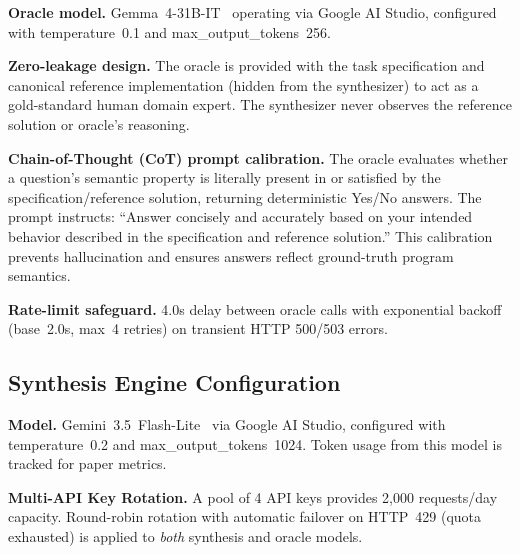 \documentclass[10pt,conference]{IEEEtran}
\begin{document}
\textbf{Oracle model.} Gemma~4-31B-IT~\cite{gemma4} operating via Google AI Studio, configured with temperature~0.1 and max\_output\_tokens~256.

\textbf{Zero-leakage design.} The oracle is provided with the task specification and canonical reference implementation (hidden from the synthesizer) to act as a gold-standard human domain expert. The synthesizer never observes the reference solution or oracle's reasoning.

\textbf{Chain-of-Thought (CoT) prompt calibration.} The oracle evaluates whether a question's semantic property is literally present in or satisfied by the specification/reference solution, returning deterministic Yes/No answers. The prompt instructs: ``Answer concisely and accurately based on your intended behavior described in the specification and reference solution.'' This calibration prevents hallucination and ensures answers reflect ground-truth program semantics.

\textbf{Rate-limit safeguard.} 4.0s delay between oracle calls with exponential backoff (base~2.0s, max~4 retries) on transient HTTP 500/503 errors.

\subsection{Synthesis Engine Configuration}
\textbf{Model.} Gemini~3.5~Flash-Lite~\cite{geminiteam} via Google AI Studio, configured with temperature~0.2 and max\_output\_tokens~1024. Token usage from this model is tracked for paper metrics.

\textbf{Multi-API Key Rotation.} A pool of 4 API keys provides 2,000 requests/day capacity. Round-robin rotation with automatic failover on HTTP~429 (quota exhausted) is applied to \textit{both} synthesis and oracle models.
\end{document}
